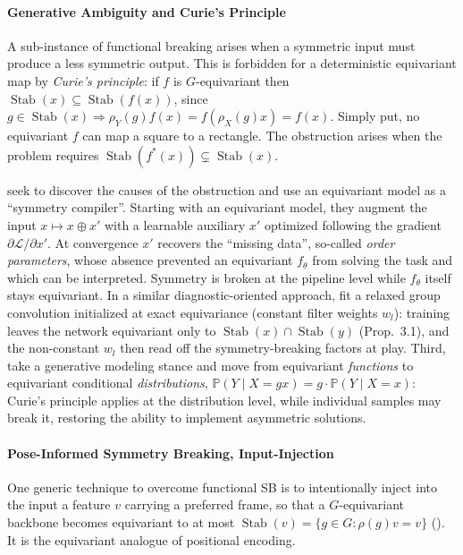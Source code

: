 \documentclass[mathematics,review,submit,moreauthors]{Definitions/mdpi}
\begin{document}
\paragraph{Generative Ambiguity and Curie's Principle}\label{par:curie-principle}
A sub-instance of functional breaking arises when a symmetric input must produce a less symmetric output.
This is forbidden for a deterministic equivariant map by \emph{Curie's principle}: if $f$ is $G$-equivariant then $\operatorname{Stab}(x)\subseteq\operatorname{Stab}(f(x))$, since $g\in\operatorname{Stab}(x)\Rightarrow\rho_Y(g)f(x)=f(\rho_X(g)x)=f(x)$.
Simply put, no equivariant $f$ can map a square to a rectangle.
The obstruction arises when the problem requires $\operatorname{Stab}(f^*(x))\subsetneq\operatorname{Stab}(x)$.

\citet{smidt2021prr} seek to discover the causes of the obstruction and use an equivariant model as a ``symmetry compiler''.
Starting with an equivariant model, they augment the input $x\mapsto x\oplus x'$ with a learnable auxiliary $x'$ optimized following the gradient $\partial\mathcal{L}/\partial x'$. 
At convergence $x'$ recovers the ``missing data'', so-called \emph{order parameters}, whose absence prevented an equivariant $f_\theta$ from solving the task and which can be interpreted.
Symmetry is broken at the pipeline level while $f_\theta$ itself stays equivariant.
In a similar diagnostic-oriented approach, \citet{wang2024p4icml} fit a relaxed group convolution initialized at exact equivariance (constant filter weights $w_l$): training leaves the network equivariant only to $\operatorname{Stab}(x)\cap\operatorname{Stab}(y)$ (Prop.~3.1), and the non-constant $w_l$ then read off the symmetry-breaking factors at play.
Third, \citet{lawrence2024} take a generative modeling stance and move from equivariant \emph{functions} to equivariant conditional \emph{distributions}, $\mathbb{P}(Y\mid X{=}gx)=g\cdot\mathbb{P}(Y\mid X{=}x)$: Curie's principle applies at the distribution level, while individual samples may break it, restoring the ability to implement asymmetric solutions.

\paragraph{Pose-Informed Symmetry Breaking, Input-Injection}
One generic technique to overcome functional SB is to intentionally inject into the input a feature $v$ carrying a preferred frame, so that a $G$-equivariant backbone becomes equivariant to at most $\operatorname{Stab}(v)=\{g\in G:\rho(g)v=v\}$ ().
It is the equivariant analogue of positional encoding.
\end{document}
